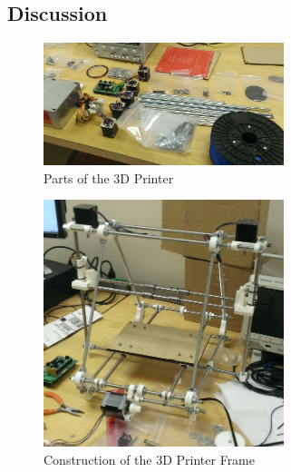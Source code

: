 \documentclass[12pt,twocolumn]{article}
\begin{document}
\begin{description}
\section{Discussion}

\begin{figure}[H]
\centering
\includegraphics[width=70mm]{WP_20130223_002.jpg}
\caption{Parts of the 3D Printer}
\label{parts}
\end{figure}

\begin{figure}[H]
\centering
\includegraphics[width=70mm]{WP_20130309_033.jpg}
\caption{Construction of the 3D Printer Frame}
\label{basebuilt}
\end{figure}


\end{description}
\end{document}
